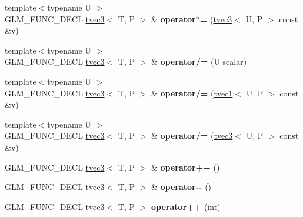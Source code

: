 \begin{DoxyCompactItemize}
\item 
\hypertarget{structglm_1_1tvec3_a924cfee1337bc2f0800519e5fbdf902f}{{\footnotesize template$<$typename U $>$ }\\G\-L\-M\-\_\-\-F\-U\-N\-C\-\_\-\-D\-E\-C\-L \hyperlink{structglm_1_1tvec3}{tvec3}$<$ T, P $>$ \& {\bfseries operator$\ast$=} (\hyperlink{structglm_1_1tvec3}{tvec3}$<$ U, P $>$ const \&v)}\label{structglm_1_1tvec3_a924cfee1337bc2f0800519e5fbdf902f}

\item 
\hypertarget{structglm_1_1tvec3_a52731a1715cbe4886455e890ad958dc3}{{\footnotesize template$<$typename U $>$ }\\G\-L\-M\-\_\-\-F\-U\-N\-C\-\_\-\-D\-E\-C\-L \hyperlink{structglm_1_1tvec3}{tvec3}$<$ T, P $>$ \& {\bfseries operator/=} (U scalar)}\label{structglm_1_1tvec3_a52731a1715cbe4886455e890ad958dc3}

\item 
\hypertarget{structglm_1_1tvec3_a05b1642c5a3b3be5a2bac556a06f3118}{{\footnotesize template$<$typename U $>$ }\\G\-L\-M\-\_\-\-F\-U\-N\-C\-\_\-\-D\-E\-C\-L \hyperlink{structglm_1_1tvec3}{tvec3}$<$ T, P $>$ \& {\bfseries operator/=} (\hyperlink{structglm_1_1tvec1}{tvec1}$<$ U, P $>$ const \&v)}\label{structglm_1_1tvec3_a05b1642c5a3b3be5a2bac556a06f3118}

\item 
\hypertarget{structglm_1_1tvec3_a0e3c90e6a8dbab2102b88775942261d1}{{\footnotesize template$<$typename U $>$ }\\G\-L\-M\-\_\-\-F\-U\-N\-C\-\_\-\-D\-E\-C\-L \hyperlink{structglm_1_1tvec3}{tvec3}$<$ T, P $>$ \& {\bfseries operator/=} (\hyperlink{structglm_1_1tvec3}{tvec3}$<$ U, P $>$ const \&v)}\label{structglm_1_1tvec3_a0e3c90e6a8dbab2102b88775942261d1}

\item 
\hypertarget{structglm_1_1tvec3_ac7d121d0cd2f4f53227be86b4c08289f}{G\-L\-M\-\_\-\-F\-U\-N\-C\-\_\-\-D\-E\-C\-L \hyperlink{structglm_1_1tvec3}{tvec3}$<$ T, P $>$ \& {\bfseries operator++} ()}\label{structglm_1_1tvec3_ac7d121d0cd2f4f53227be86b4c08289f}

\item 
\hypertarget{structglm_1_1tvec3_a61447785338db749ad3bdb5c97b8c710}{G\-L\-M\-\_\-\-F\-U\-N\-C\-\_\-\-D\-E\-C\-L \hyperlink{structglm_1_1tvec3}{tvec3}$<$ T, P $>$ \& {\bfseries operator-\/-\/} ()}\label{structglm_1_1tvec3_a61447785338db749ad3bdb5c97b8c710}

\item 
\hypertarget{structglm_1_1tvec3_ab316ac7b6ea57d038e304dc43b9f3490}{G\-L\-M\-\_\-\-F\-U\-N\-C\-\_\-\-D\-E\-C\-L \hyperlink{structglm_1_1tvec3}{tvec3}$<$ T, P $>$ {\bfseries operator++} (int)}\label{structglm_1_1tvec3_ab316ac7b6ea57d038e304dc43b9f3490}


\end{DoxyCompactItemize}
